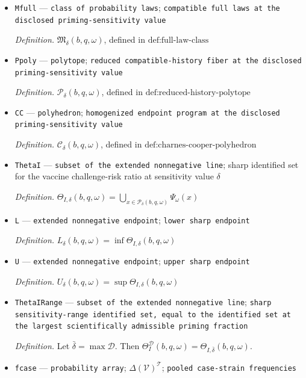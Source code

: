 \documentclass{article}
\begin{document}
\begin{itemize}
  \item \texttt{Mfull} --- \texttt{class of probability laws}; \texttt{compatible full laws at the disclosed priming-\allowbreak{}sensitivity value}
  \par\smallskip\noindent\emph{Definition.} \(\mathfrak M_\delta(b,q,\omega)\), defined in \(\text{def:full-law-class}\)
  \item \texttt{Ppoly} --- \texttt{polytope}; \texttt{reduced compatible-\allowbreak{}history fiber at the disclosed priming-\allowbreak{}sensitivity value}
  \par\smallskip\noindent\emph{Definition.} \(\mathcal P_\delta(b,q,\omega)\), defined in \(\text{def:reduced-history-polytope}\)
  \item \texttt{CC} --- \texttt{polyhedron}; \texttt{homogenized endpoint program at the disclosed priming-\allowbreak{}sensitivity value}
  \par\smallskip\noindent\emph{Definition.} \(\mathcal C_\delta(b,q,\omega)\), defined in \(\text{def:charnes-cooper-polyhedron}\)
  \item \texttt{ThetaI} --- \texttt{subset of the extended nonnegative line}; sharp identified set for the vaccine challenge-risk ratio at sensitivity value \(\delta\)
  \par\smallskip\noindent\emph{Definition.} \(\Theta_{I,\delta}(b,q,\omega)=\bigcup_{x\in\mathcal P_\delta(b,q,\omega)}\Psi_\omega(x)\)
  \item \texttt{L} --- \texttt{extended nonnegative endpoint}; \texttt{lower sharp endpoint}
  \par\smallskip\noindent\emph{Definition.} \(L_\delta(b,q,\omega)=\inf\Theta_{I,\delta}(b,q,\omega)\)
  \item \texttt{U} --- \texttt{extended nonnegative endpoint}; \texttt{upper sharp endpoint}
  \par\smallskip\noindent\emph{Definition.} \(U_\delta(b,q,\omega)=\sup\Theta_{I,\delta}(b,q,\omega)\)
  \item \texttt{ThetaIRange} --- \texttt{subset of the extended nonnegative line}; \texttt{sharp sensitivity-\allowbreak{}range identified set,\allowbreak{} equal to the identified set at the largest scientifically admissible priming fraction}
  \par\smallskip\noindent\emph{Definition.} Let \(\bar\delta=\max\mathcal D\). Then \(\Theta_I^{\mathcal D}(b,q,\omega)=\Theta_{I,\bar\delta}(b,q,\omega)\).
  \item \texttt{fcase} --- \texttt{probability array}; \(\Delta(\mathcal V)^{\mathcal T}\); \texttt{pooled case-\allowbreak{}strain frequencies}

\end{itemize}
\end{document}
